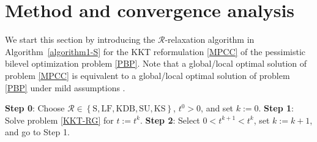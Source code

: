 \section{Method and convergence analysis}\label{sec:method and convergence}
We start this section by introducing the $\mathcal{R}$-relaxation algorithm in Algorithm~\ref{algorithm1-S} for the KKT reformulation \eqref{MPCC} of the pessimistic bilevel optimization problem \eqref{PBP}. 
Note that a global/local optimal solution of problem \eqref{MPCC}  is equivalent to a global/local optimal solution of problem \eqref{PBP} under mild assumptions \cite{Au}.
\begin{algorithm}[H]
\caption{$\mathcal{R}$--relaxation method for pessimistic bilevel optimization}
\label{algorithm1-S}
\begin{algorithmic}
\STATE \textbf{Step 0}: Choose $\mathcal{R}\in \left\{\mbox{S}, \mbox{LF}, \mbox{KDB}, \mbox{SU}, \mbox{KS}\right\}$, $t^0>0$, and set  $k:=0$.
\STATE \textbf{Step 1}: Solve problem \eqref{KKT-RG} for $t:=t^k$.
\STATE \textbf{Step 2}: Select $0<t^{k+1}<t^k$, set $k:=k+1$, and go to Step 1.
\end{algorithmic}
\end{algorithm}
${}$\\[-7.1ex]

